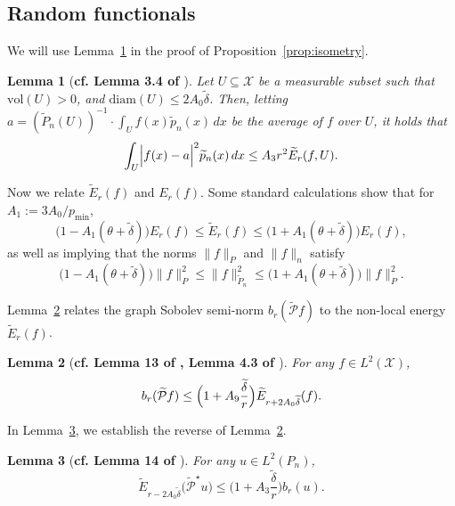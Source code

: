\documentclass[twoside]{article}
\newcommand{\diam}{\mathrm{diam}}
\newcommand{\1}{\mathbf{1}}
\newcommand{\Xset}{\mathcal{X}}
\newcommand{\Leb}{L}
\newcommand{\mc}[1]{\mathcal{#1}}
\newcommand{\wt}[1]{\widetilde{#1}}
\newtheorem{lemma}{Lemma}
\theoremstyle{definition}
\theoremstyle{remark}
\begin{document}
\subsection{Random functionals}
\label{subsec:random_functionals}

We will use Lemma~\ref{lem:poincare} in the proof of Proposition~\ref{prop:isometry}. 
\begin{lemma}[\textbf{cf. Lemma 3.4 of \citet{burago2014}}]
	\label{lem:poincare}
	Let $U \subseteq \Xset$ be a measurable subset such that $\mathrm{vol}(U) > 0$, and $\diam(U) \leq 2A_0\wt{\delta}$. Then, letting $a = (\wt{P}_n(U))^{-1} \cdot \int_{U} f(x) \wt{p}_n(x) \,dx$ be the average of $f$ over $U$, it holds that
	\begin{equation*}
	\int_{U} \Bigl|f(x)-a\Bigr|^2 \wt{p}_n(x)\,dx \leq A_3 r^2 \wt{E}_r(f,U).
	\end{equation*}
\end{lemma}

Now we relate $\wt{E}_r(f)$ and $E_r(f)$. Some standard calculations show that for $A_1 := 3A_0/p_{\min}$,
\begin{equation}
\label{eqn:calder19_1}
\bigl(1 - A_1(\theta + \wt{\delta})\bigr) E_r(f) \leq \wt{E}_r(f) \leq \bigl(1 + A_1(\theta + \wt{\delta})\bigr) E_r(f),
\end{equation}
as well as implying that the norms $\|f\|_{P}$ and $\|f\|_{n}$ satisfy
\begin{equation}
\label{eqn:calder19_2}
\bigl(1 - A_1(\theta + \wt{\delta})\bigr) \|f\|_{P}^2 \leq \|f\|_{\wt{P}_n}^2 \leq \bigl(1 + A_1(\theta + \wt{\delta})\bigr) \|f\|_{P}^2.
\end{equation}

Lemma~\ref{lem:first_order_graph_sobolev_seminorm_discretized} relates the graph Sobolev semi-norm $b_r(\wt{\mc{P}}f)$ to the non-local energy $\wt{E}_r(f)$. 
\begin{lemma}[\textbf{cf. Lemma 13 of \citet{trillos2019}, Lemma 4.3 of \citet{burago2014}}]
	\label{lem:first_order_graph_sobolev_seminorm_discretized}
	For any $f \in \Leb^2(\Xset)$,
	\begin{equation*}
	b_r(\wt{\mc{P}}f) \leq \Bigl(1 + A_9\frac{\wt{\delta}}{r}\Bigr) \wt{E}_{r + 2A_0\wt{\delta}}(f).
	\end{equation*}
\end{lemma}

In Lemma~\ref{lem:first_order_graph_sobolev_seminorm_discretized_lb}, we establish the reverse of Lemma~\ref{lem:first_order_graph_sobolev_seminorm_discretized}. 
\begin{lemma}[\textbf{cf. Lemma 14 of \citet{trillos2019}}]
	\label{lem:first_order_graph_sobolev_seminorm_discretized_lb}
	For any $u \in \Leb^2(P_n)$, 
	\begin{equation*}
	\wt{E}_{r - 2A_0\wt{\delta}}\bigl(\wt{\mc{P}}^{\star}u\bigr) \leq \biggl(1 + A_3\frac{\wt{\delta}}{r}\biggr) b_{r}(u).
	\end{equation*}
\end{lemma}
\end{document}
